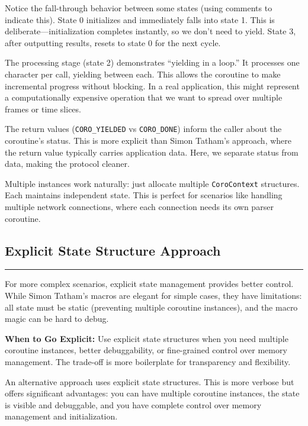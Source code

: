 Notice the fall-through behavior between some states (using comments to indicate this). State 0 initializes and immediately falls into state 1. This is deliberate---initialization completes instantly, so we don't need to yield. State 3, after outputting results, resets to state 0 for the next cycle.

The processing stage (state 2) demonstrates ``yielding in a loop.'' It processes one character per call, yielding between each. This allows the coroutine to make incremental progress without blocking. In a real application, this might represent a computationally expensive operation that we want to spread over multiple frames or time slices.

The return values (\texttt{CORO\_YIELDED} vs \texttt{CORO\_DONE}) inform the caller about the coroutine's status. This is more explicit than Simon Tatham's approach, where the return value typically carries application data. Here, we separate status from data, making the protocol cleaner.

Multiple instances work naturally: just allocate multiple \texttt{CoroContext} structures. Each maintains independent state. This is perfect for scenarios like handling multiple network connections, where each connection needs its own parser coroutine.

\vspace{0.5cm}
\subsection{Explicit State Structure Approach}

\noindent\rule{\textwidth}{0.4pt}
\vspace{0.2cm}

For more complex scenarios, explicit state management provides better control. While Simon Tatham's macros are elegant for simple cases, they have limitations: all state must be static (preventing multiple coroutine instances), and the macro magic can be hard to debug.

\begin{tipbox}
\textbf{When to Go Explicit:} Use explicit state structures when you need multiple coroutine instances, better debuggability, or fine-grained control over memory management. The trade-off is more boilerplate for transparency and flexibility.
\end{tipbox}

\vspace{0.2cm}
\noindent An alternative approach uses explicit state structures. This is more verbose but offers significant advantages: you can have multiple coroutine instances, the state is visible and debuggable, and you have complete control over memory management and initialization.

